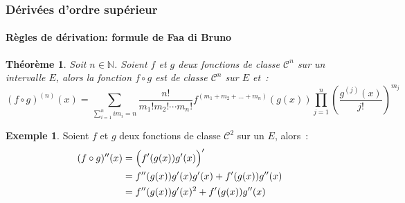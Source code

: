 \documentclass[10pt,notheorems]{beamer}
\theoremstyle{plain}
\newtheorem{theorem}{Théorème}
\theoremstyle{definition} %
\newtheorem{example}{Exemple}
\begin{document}
\begin{frame}
  \frametitle{Dérivées d'ordre supérieur}
  \framesubtitle{Règles de dérivation: formule de Faa di Bruno}
  \hypertarget{slide_derivees_ordre_n_5}{}

  \begin{theorem}\label{thm:faa-di-bruno}
    Soit $n\in\mathbb N$. Soient $f$ et $g$ deux fonctions de classe
    $\mathcal C^n$ sur un intervalle $E$, alors la fonction $f\circ g$
    est de classe $\mathcal C^n$ sur $E$ et~:
    {\small\[
        (f\circ g)^{(n)}(x) = \sum_{\sum_{i=1}^n im_i=n} \frac{n!}{m_1!m_2!\cdots m_n!} f^{(m_1+m_2+\dots+m_n)}(g(x)) \prod_{j=1}^n \left(\frac{g^{(j)}(x)}{j!}\right)^{m_j}
      \]}
  \end{theorem}

  \begin{example}
    Soient $f$ et $g$ deux fonctions de classe $\mathcal C^2$ sur un $E$, alors~:
    \[
      \begin{split}
        (f\circ g)''(x) &= \Bigl(f'(g(x))g'(x)\Bigr)'\\
        &= f''(g(x))g'(x)g'(x)+f'(g(x))g''(x)\\
        &= f''(g(x))g'(x)^2+f'(g(x))g''(x)\\
      \end{split}
    \]
  \end{example}
\end{frame}
\end{document}
